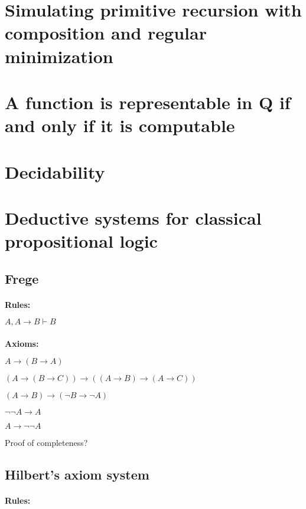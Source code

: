 \documentclass{article}
\begin{document}
\section{Simulating primitive recursion with composition and regular minimization}

\section{A function is representable in $\mathbf{Q}$ if and only if it is computable}

\section{Decidability}

\section{Deductive systems for classical propositional logic}

\newpage
\subsection{Frege}
\paragraph{}
\textbf{Rules:}

$A, A \rightarrow B \vdash B$

\paragraph{}
\textbf{Axioms:}

$A \rightarrow (B \rightarrow A)$

$(A \rightarrow (B \rightarrow C)) \rightarrow ((A \rightarrow B) \rightarrow (A \rightarrow C))$

$(A \rightarrow B) \rightarrow (\neg B \rightarrow \neg A)$

$\neg \neg A \rightarrow A $

$A \rightarrow \neg \neg A$


Proof of completeness?

\subsection{Hilbert's axiom system}
\paragraph{}
\textbf{Rules:}
\end{document}
